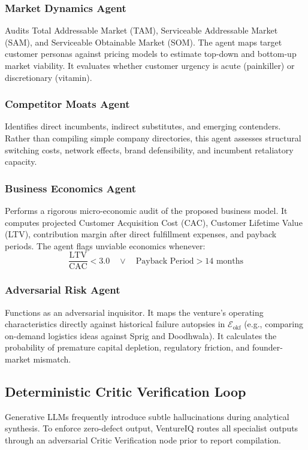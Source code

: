 \documentclass[conference]{IEEEtran}
\begin{document}
\subsubsection{Market Dynamics Agent}
Audits Total Addressable Market (TAM), Serviceable Addressable Market (SAM), and Serviceable Obtainable Market (SOM). The agent maps target customer personas against pricing models to estimate top-down and bottom-up market viability. It evaluates whether customer urgency is acute (painkiller) or discretionary (vitamin).

\subsubsection{Competitor Moats Agent}
Identifies direct incumbents, indirect substitutes, and emerging contenders. Rather than compiling simple company directories, this agent assesses structural switching costs, network effects, brand defensibility, and incumbent retaliatory capacity.

\subsubsection{Business Economics Agent}
Performs a rigorous micro-economic audit of the proposed business model. It computes projected Customer Acquisition Cost (CAC), Customer Lifetime Value (LTV), contribution margin after direct fulfillment expenses, and payback periods. The agent flags unviable economics whenever:
\begin{equation}
\frac{\text{LTV}}{\text{CAC}} < 3.0 \quad \lor \quad \text{Payback Period} > 14 \text{ months}
\end{equation}

\subsubsection{Adversarial Risk Agent}
Functions as an adversarial inquisitor. It maps the venture's operating characteristics directly against historical failure autopsies in $\mathcal{E}_{\text{okf}}$ (e.g., comparing on-demand logistics ideas against Sprig and Doodhwala). It calculates the probability of premature capital depletion, regulatory friction, and founder-market mismatch.

\subsection{Deterministic Critic Verification Loop}
Generative LLMs frequently introduce subtle hallucinations during analytical synthesis. To enforce zero-defect output, VentureIQ routes all specialist outputs through an adversarial Critic Verification node prior to report compilation.
\end{document}
